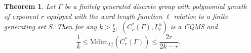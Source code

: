 \documentclass[a4paper,11pt,reqno]{amsart}
\theoremstyle{plain}
\newtheorem{thm}{Theorem}[section]
\theoremstyle{mainthmstyle}
\theoremstyle{named}
\numberwithin{equation}{section}
\newcommand{\Bea}{\begin{eqnarray*}}
\newcommand{\Eea}{\end{eqnarray*}}
\begin{document}

\begin{thm}\label{finiteMdim} Let $\Gamma$ be a finitely generated discrete group with polynomial growth of exponent $r$ equipped with the word length function $\ell$ relative to a finite generating set $S.$ Then for any $k>\frac {r} {2},$ $(C^{\ast}_{r}(\Gamma),L^{k}_{\ell})$ is a CQMS and
\begin{displaymath}
    \frac {1} {k} \leq \mathrm {Mdim}_{L_{\ell}^{k}} \left (C_{r}^{\ast} (\Gamma) \right ) \leq \frac {2 r} {2 k - r}.
\end{displaymath}    
\end{thm}
\end{document}
